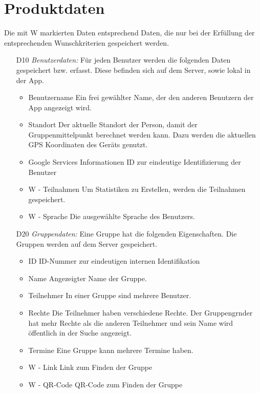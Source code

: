 \documentclass{scrartcl}
\begin{document}
	
	\newpage
	
	
	\section{Produktdaten}
	Die mit W markierten Daten entsprechend Daten, die nur bei der Erfüllung der entsprechenden Wunschkriterien gespeichert werden.
	\begin{itemize}
		\item [D10] \textit{Benutzerdaten:}
		Für jeden Benutzer werden die folgenden Daten gespeichert bzw. erfasst. Diese befinden sich auf dem Server, sowie lokal in der App.
		\begin{itemize}
			\item Benutzername
			\newline Ein frei gewählter Name, der den anderen Benutzern der App angezeigt wird.
			\item Standort
			\newline Der aktuelle Standort der Person, damit der Gruppenmittelpunkt berechnet werden kann. Dazu werden die aktuellen GPS Koordinaten des Geräts genutzt.
			\item \gls{Google Services} Informationen
			\newline ID zur eindeutige Identifizierung der Benutzer
			\item W - Teilnahmen
			\newline Um Statistiken zu Erstellen, werden die Teilnahmen gespeichert.
			\item W - Sprache
			\newline Die ausgewählte Sprache des Benutzers.
			
		\end{itemize}
		
		\item [D20] \textit{Gruppendaten:}
		Eine Gruppe hat die folgenden Eigenschaften.
		Die Gruppen werden auf dem Server gespeichert.
		\begin{itemize}
			\item ID
			\newline ID-Nummer zur eindeutigen internen Identifikation
			\item Name
			\newline Angezeigter Name der Gruppe.
			\item \gls{Teilnehmer}
			\newline In einer Gruppe sind mehrere Benutzer.
			\item Rechte
			\newline Die \gls{Teilnehmer} haben verschiedene Rechte. Der \gls{Gruppengrnder} hat mehr Rechte als die anderen Teilnehmer und sein Name wird öffentlich in der Suche angezeigt.
			\item Termine
			\newline Eine Gruppe kann mehrere Termine haben.
			\item W - Link
			\newline Link zum Finden der Gruppe
			\item W - QR-Code
			\newline QR-Code zum Finden der Gruppe
		\end{itemize}
		

\end{itemize}
\end{document}
